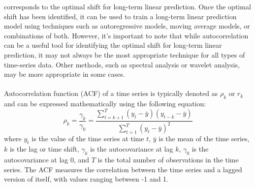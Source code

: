     corresponds to the optimal shift for long-term linear prediction.
    Once the optimal shift has been identified, it can be used to train a long-term linear prediction model using techniques such as autoregressive
    models, moving average models, or combinations of both. However, it's important to note that while autocorrelation can be a useful tool for
    identifying the optimal shift for long-term linear prediction, it may not always be the most appropriate technique for all types of time-series data.
    Other methods, such as spectral analysis or wavelet analysis, may be more appropriate in some cases.\\
    \\
    Autocorrelation function (ACF) of a time series is typically denoted as $\rho_k$ or $r_k$ and can be expressed mathematically using the following equation:
    \begin{equation}
        \rho_k = \frac{\gamma_k}{\gamma_0} = \frac{\sum_{t=k+1}^{T}(y_t - \bar{y})(y_{t-k} - \bar{y})}{\sum_{t=1}^{T}(y_t - \bar{y})^2}
    \end{equation}
    where $y_t$ is the value of the time series at time $t$, $\bar{y}$ is the mean of the time series, $k$ is the lag or time shift, $\gamma_k$ is the
    autocovariance at lag $k$, $\gamma_0$ is the autocovariance at lag 0, and $T$ is the total number of observations in the time series.
    The ACF measures the correlation between the time series and a lagged version of itself, with values ranging between -1 and 1.

